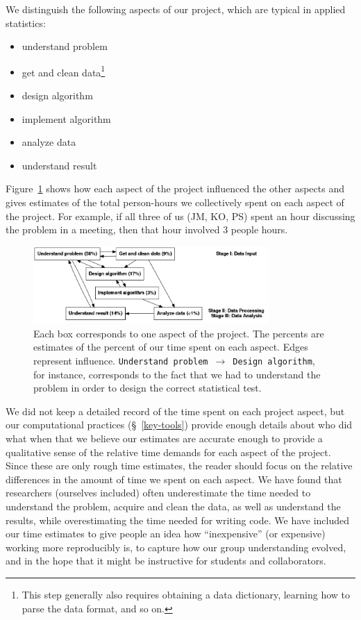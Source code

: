 \documentclass[]{article}
\begin{document}
We distinguish the following aspects of our project, which are typical in
applied statistics:
\begin{itemize}
    \item understand problem
    \item get and clean data\footnote{
        This step generally also requires obtaining a data dictionary, learning
        how to parse the data format, and so on.
        }
    \item design algorithm
    \item implement algorithm
    \item analyze data
    \item understand result
\end{itemize}
Figure~\ref{fig:work_process} shows how each aspect of the
project influenced the other aspects and gives estimates of the total person-hours
we collectively spent on each aspect of the project.
For example, if all three of us (JM, KO, PS) spent an hour discussing the
problem in a meeting, then that hour involved 3 people hours.

\begin{figure}[h]
  \centering
    \includegraphics[width=0.8\textwidth]{_fig/work_process_bids.png}
  \caption{
  \small
    Each box corresponds to one aspect of the project.
    The percents are estimates of the percent of our time spent on each aspect.
    Edges represent influence.
    \texttt{Understand problem}~$\to$~\texttt{Design algorithm}, for instance,
    corresponds to the fact that we had to understand the problem in order to
    design the correct statistical test.\label{fig:work_process}}
\end{figure}

We did not keep a detailed record of the time spent on each project aspect, but
our computational practices (\S~\ref{key-tools}) provide enough details about
who did what when that we believe our estimates are accurate enough to provide
a qualitative sense of the relative time demands for each aspect of the
project.
Since these are only rough time estimates, the reader should focus on the
relative differences in the amount of time we spent on each aspect.
We have found that researchers (ourselves included) often underestimate the
time needed to understand the problem, acquire and clean the data, as well as
understand the results, while overestimating the time needed for writing code.
We have included our time estimates to give people an idea how ``inexpensive''
(or expensive) working more reproducibly is, to capture how our group
understanding evolved, and in the  hope that it might be instructive for
students and collaborators.
\end{document}
